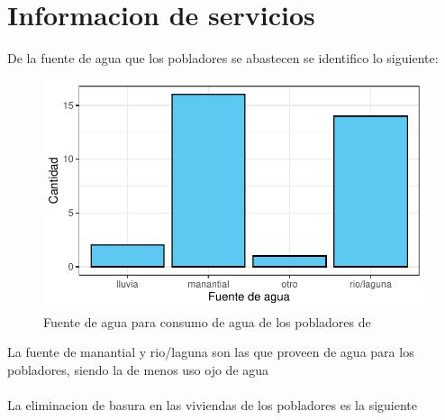 \documentclass[12pt]{article}\usepackage[]{graphicx}\usepackage[]{xcolor}
\makeatletter
\def\maxwidth{ %
  \ifdim\Gin@nat@width>\linewidth
    \linewidth
  \else
    \Gin@nat@width
  \fi
}
\newenvironment{knitrout}{}{} %
\makeatother
\begin{document}
	\section{Informacion de servicios}
	De la fuente de agua que los pobladores se abastecen se identifico lo siguiente:
	\begin{figure}[H]
	\centering
\begin{knitrout}
\color{fgcolor}
\includegraphics[width=\maxwidth]{figure/seis-1} 
\end{knitrout}
	\caption{Fuente de agua para consumo de agua de los pobladores de \comunidad}
	\end{figure}
	La fuente de manantial y rio/laguna son las que proveen de agua para los pobladores, siendo la de menos uso ojo de agua\\
	\\
	La eliminacion de basura en las viviendas de los pobladores es la siguiente
\end{document}
